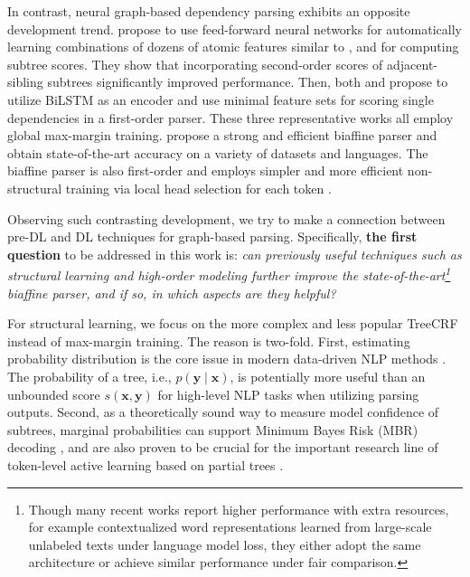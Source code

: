 \documentclass[11pt,a4paper]{article}
\begin{document}
In contrast, neural graph-based dependency parsing exhibits an opposite development trend.
\citet{pei-etal-2015-effective} propose to use feed-forward neural networks for automatically learning combinations of dozens of atomic features similar to \citet{chen-manning-2014-fast}, and for computing subtree scores.
They show that incorporating second-order scores of adjacent-sibling subtrees significantly improved performance.
Then, both \citet{wang-chang-2016-graph} and \citet{kiperwasser-goldberg-2016-simple} propose to utilize BiLSTM as an encoder and
use minimal feature sets for scoring single dependencies in a first-order parser.
These three representative works all employ global max-margin training.
\citet{Timothy-d17-biaffine} propose a strong and efficient biaffine parser
and obtain state-of-the-art accuracy on a variety of datasets and languages.
The biaffine parser is also first-order and
employs simpler and more efficient non-structural training
via local head selection for each token \cite{zhang-etal-2017-dependency-parsing}.




Observing such contrasting development, we try to make a connection between pre-DL and DL techniques for graph-based parsing.
Specifically, \textbf{the first question} to be addressed in this work is:
\emph{can previously useful techniques such as structural learning and high-order modeling further improve the state-of-the-art\footnote{
  Though many recent works report higher performance with extra resources,
  for example contextualized word representations learned from large-scale unlabeled texts under language model loss,
  they either adopt the same architecture or achieve similar performance under fair comparison.
}
 biaffine parser,
and if so, in which aspects are they helpful? }

For structural learning, we focus on the more complex and less popular TreeCRF instead of max-margin training.
The reason is two-fold.
First, estimating probability distribution is the core issue in modern data-driven NLP methods \cite{le-zuidema-2014-inside}.
The probability of a tree, i.e., $p(\boldsymbol{y}\mid\boldsymbol{x})$, is potentially more useful than an unbounded score $s (\boldsymbol{x}, \boldsymbol{y})$
for high-level NLP tasks when utilizing parsing outputs.
Second, as a theoretically sound way to measure model confidence of subtrees, marginal probabilities can support Minimum Bayes Risk (MBR) decoding \cite{smith-smith-2007-probabilistic}, and are also proven to be crucial
for the important research line of token-level active learning based on partial trees \cite{li-etal-2016-active}.
\end{document}
